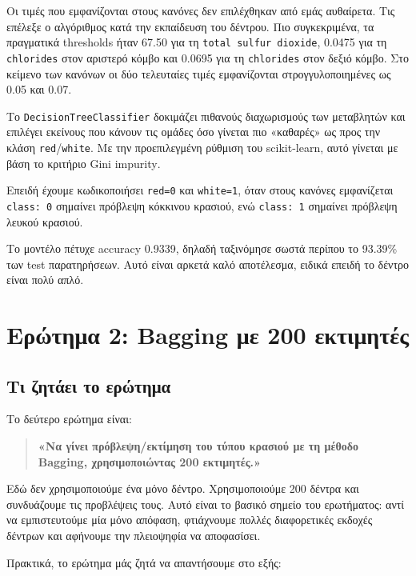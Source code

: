 \documentclass[12pt,a4paper]{article}
\newcommand{\code}[1]{\texttt{\textenglish{#1}}}
\begin{document}
Οι τιμές που εμφανίζονται στους κανόνες δεν επιλέχθηκαν από εμάς αυθαίρετα.
Τις επέλεξε ο αλγόριθμος κατά την εκπαίδευση του δέντρου. Πιο συγκεκριμένα,
τα πραγματικά thresholds ήταν 67.50 για τη \code{total sulfur dioxide},
0.0475 για τη \code{chlorides} στον αριστερό κόμβο και 0.0695 για τη
\code{chlorides} στον δεξιό κόμβο. Στο κείμενο των κανόνων οι δύο τελευταίες
τιμές εμφανίζονται στρογγυλοποιημένες ως 0.05 και 0.07.

Το \code{DecisionTreeClassifier} δοκιμάζει πιθανούς διαχωρισμούς των
μεταβλητών και επιλέγει εκείνους που κάνουν τις ομάδες όσο γίνεται πιο
«καθαρές» ως προς την κλάση \code{red}/\code{white}. Με την προεπιλεγμένη
ρύθμιση του scikit-learn, αυτό γίνεται με βάση το κριτήριο
\textenglish{Gini impurity}.

Επειδή έχουμε κωδικοποιήσει \code{red=0} και \code{white=1}, όταν στους κανόνες
εμφανίζεται \code{class: 0} σημαίνει πρόβλεψη κόκκινου κρασιού, ενώ
\code{class: 1} σημαίνει πρόβλεψη λευκού κρασιού.

Το μοντέλο πέτυχε accuracy 0.9339, δηλαδή ταξινόμησε σωστά περίπου το 93.39\%
των test παρατηρήσεων. Αυτό είναι αρκετά καλό αποτέλεσμα, ειδικά επειδή το
δέντρο είναι πολύ απλό.

\section{Ερώτημα 2: Bagging με 200 εκτιμητές}

\subsection{Τι ζητάει το ερώτημα}

Το δεύτερο ερώτημα είναι:

\begin{quote}
\textbf{«Να γίνει πρόβλεψη/εκτίμηση του τύπου κρασιού με τη μέθοδο Bagging,
χρησιμοποιώντας 200 εκτιμητές.»}
\end{quote}

Εδώ δεν χρησιμοποιούμε ένα μόνο δέντρο. Χρησιμοποιούμε 200 δέντρα και
συνδυάζουμε τις προβλέψεις τους. Αυτό είναι το βασικό σημείο του ερωτήματος:
αντί να εμπιστευτούμε μία μόνο απόφαση, φτιάχνουμε πολλές διαφορετικές
εκδοχές δέντρων και αφήνουμε την πλειοψηφία να αποφασίσει.

Πρακτικά, το ερώτημα μάς ζητά να απαντήσουμε στο εξής:
\end{document}
